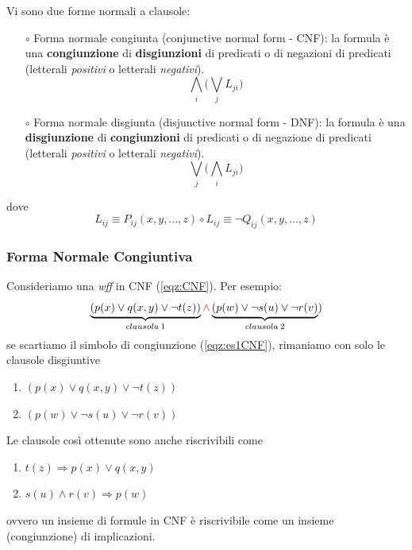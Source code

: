 \documentclass[11pt]{article}
\begin{document}
Vi sono due forme normali a clausole:
\begin{itemize}
	\item[$\circ$]\color{blue}Forma normale congiunta\color{black} (conjunctive normal form - CNF): la formula è una \textbf{congiunzione} di \textbf{disgiunzioni} di predicati o di negazioni di predicati (letterali \textit{positivi} o letterali \textit{negativi}).
	\begin{equation}
	\label{eqz:CNF}
	\bigwedge_i \bigg( \bigvee_j L_{ji} \bigg) 
	\end{equation}
	\item[$\circ$]\color{blue}Forma normale disgiunta\color{black} (disjunctive normal form - DNF): la formula è una \textbf{disgiunzione} di \textbf{congiunzioni} di predicati o di negazione di predicati (letterali \textit{positivi} o letterali \textit{negativi}).
	\begin{equation}
	\bigvee_j \bigg( \bigwedge_i L_{ji} \bigg) 
	\end{equation}
\end{itemize}
dove 
\begin{equation*}
	L_{ij} \equiv P_{ij} (x,y,...,z) \circ L_{ij} \equiv \neg Q_{ij}(x,y,...,z)
\end{equation*}

\subsubsection{Forma Normale Congiuntiva}
Consideriamo una \textit{wff} in CNF (\ref{eqz:CNF}). Per esempio:
\begin{equation}
\label{eqz:es1CNF}
\underbrace{(p(x) \vee q(x,y) \vee \neg t(z))}_{clausola \medspace 1} \color{red}\wedge\color{black} \underbrace{(p(w) \vee \neg s(u) \vee \neg r(v)}_{clausola \medspace 2})
\end{equation}
se scartiamo il simbolo di \color{red}congiunzione \color{black}  (\ref{eqz:es1CNF}), rimaniamo con solo le clausole disgiuntive
\begin{enumerate}
	\item $(p(x) \vee q(x,y) \vee \neg t(z))$
	\item $(p(w) \vee \neg s(u) \vee \neg r(v))$
\end{enumerate}
Le clausole così ottenute sono anche riscrivibili come
\begin{enumerate}
	\item $t(z) \Rightarrow p(x) \vee q(x,y)$ 
	\item $s(u) \wedge r(v) \Rightarrow p(w)$
\end{enumerate}
ovvero un insieme di formule in CNF è riscrivibile come un insieme (congiunzione) di implicazioni.
\end{document}
